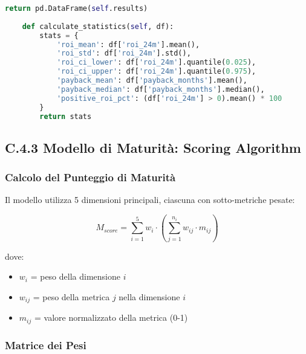 \begin{lstlisting}[language=Python, caption=Simulazione Monte Carlo per ROI Compliance]
        return pd.DataFrame(self.results)
    
    def calculate_statistics(self, df):
        stats = {
            'roi_mean': df['roi_24m'].mean(),
            'roi_std': df['roi_24m'].std(),
            'roi_ci_lower': df['roi_24m'].quantile(0.025),
            'roi_ci_upper': df['roi_24m'].quantile(0.975),
            'payback_mean': df['payback_months'].mean(),
            'payback_median': df['payback_months'].median(),
            'positive_roi_pct': (df['roi_24m'] > 0).mean() * 100
        }
        return stats
\end{lstlisting}

\subsection{C.4.3 Modello di Maturità: Scoring Algorithm}

\subsubsection{Calcolo del Punteggio di Maturità}

Il modello utilizza 5 dimensioni principali, ciascuna con sotto-metriche pesate:

\begin{equation}
M_{score} = \sum_{i=1}^{5} w_i \cdot \left(\sum_{j=1}^{n_i} w_{ij} \cdot m_{ij}\right)
\end{equation}

dove:
\begin{itemize}
    \item $w_i$ = peso della dimensione $i$
    \item $w_{ij}$ = peso della metrica $j$ nella dimensione $i$
    \item $m_{ij}$ = valore normalizzato della metrica (0-1)
\end{itemize}

\subsubsection{Matrice dei Pesi}

